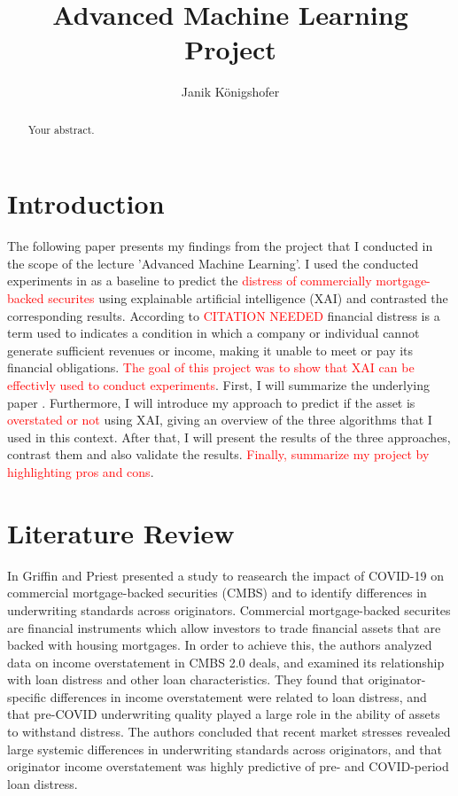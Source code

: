 \documentclass{article}
\title{Advanced Machine Learning Project}
\author{Janik Königshofer}
\begin{document}
\maketitle

\begin{abstract}
Your abstract.
\end{abstract}

\section{Introduction}
The following paper presents my findings from the project that I conducted in the scope of the lecture 'Advanced Machine Learning'.
I used the conducted experiments in \cite{CMBS-Paper} as a baseline to predict the \textcolor{red}{distress of commercially mortgage-backed securites} using explainable artificial intelligence (XAI) and contrasted the corresponding results.
According to \textcolor{red}{CITATION NEEDED} financial distress is a term used to indicates a condition in which a company or individual cannot generate sufficient revenues or income, making it unable to meet or pay its financial obligations. 
\textcolor{red}{The goal of this project was to show that XAI can be effectivly used to conduct experiments}.
First, I will summarize the underlying paper \cite{CMBS-Paper}. Furthermore, I will introduce my approach to predict if the asset is \textcolor{red}{overstated or not} using XAI, giving an overview of the three algorithms that I used in this context. After that, I will present the results of the three approaches, contrast them and also validate the results.
\textcolor{red}{Finally, summarize my project by highlighting pros and cons}.

\section{Literature Review}
In \cite{CMBS-Paper} Griffin and Priest presented a study to reasearch the impact of COVID-19 on commercial mortgage-backed securities (CMBS) and to identify differences in underwriting standards across originators.
Commercial mortgage-backed securites are financial instruments which allow investors to trade financial assets that are backed with housing mortgages. 
In order to achieve this, the authors analyzed data on income overstatement in CMBS 2.0 deals, and examined its relationship with loan distress and other loan characteristics.
They found that originator-specific differences in income overstatement were related to loan distress, and that pre-COVID underwriting quality played a large role in the ability of assets to withstand distress. The authors concluded that recent market stresses revealed large systemic differences in underwriting standards across originators, and that originator income overstatement was highly predictive of pre- and COVID-period loan distress.
\end{document}
